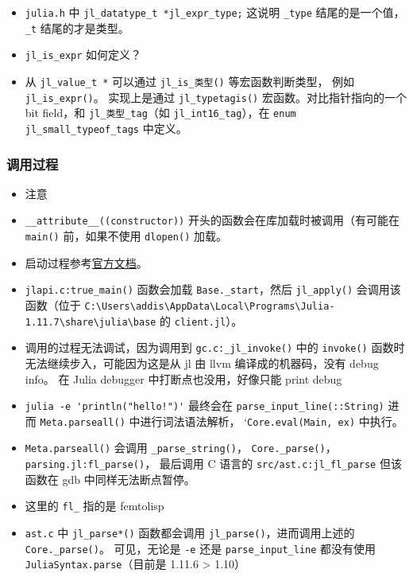 \begin{itemize}
\begin{lstlisting}[language=cpp]
    // followed by alignment padding and inline data, or owner pointer
} jl_array_t;
\end{lstlisting}
\verb`jl_array_len()` 可以获取长度， \verb`ajl_array_ptr_ref()` 可以获取矩阵元

\item \verb`julia.h` 中 \verb`jl_datatype_t *jl_expr_type;` 这说明 \verb`_type` 结尾的是一个值，\verb`_t` 结尾的才是类型。
\item \verb`jl_is_expr` 如何定义？
\item 从 \verb`jl_value_t *` 可以通过 \verb`jl_is_类型()` 等宏函数判断类型， 例如 \verb`jl_is_expr()`。 实现上是通过 \verb`jl_typetagis()` 宏函数。对比指针指向的一个 bit field，和 \verb`jl_类型_tag`（如 \verb`jl_int16_tag`），在 \verb`enum jl_small_typeof_tags` 中定义。
\end{itemize}


\subsubsection{调用过程}
\begin{itemize}
\item 注意 \item \verb`__attribute__((constructor))` 开头的函数会在库加载时被调用（有可能在 \verb`main()` 前，如果不使用 \verb`dlopen()` 加载。
\item 启动过程参考\href{https://docs.julialang.org/en/v1/devdocs/init/}{官方文档}。
\item \verb`jlapi.c:true_main()` 函数会加载 \verb`Base._start`，然后 \verb`jl_apply()` 会调用该函数（位于 \verb`C:\Users\addis\AppData\Local\Programs\Julia-1.11.7\share\julia\base` 的 \verb`client.jl`）。
\item 调用的过程无法调试，因为调用到 \verb`gc.c:_jl_invoke()` 中的 \verb`invoke()` 函数时无法继续步入，可能因为这是从 jl 由 llvm 编译成的机器码，没有 debug info。 在 Julia debugger 中打断点也没用，好像只能 print debug
\item \verb`julia -e 'println("hello!")'` 最终会在 \verb`parse_input_line(::String)` 进而 \verb`Meta.parseall()` 中进行词法语法解析， `\verb`Core.eval(Main, ex)` 中执行。
\item \verb`Meta.parseall()` 会调用 \verb`_parse_string()`， \verb`Core._parse()`， \verb`parsing.jl:fl_parse()`， 最后调用 C 语言的 \verb`src/ast.c:jl_fl_parse` 但该函数在 gdb 中同样无法断点暂停。
\item 这里的 \verb`fl_` 指的是 femtolisp
\item \verb`ast.c` 中 \verb`jl_parse*()` 函数都会调用 \verb`jl_parse()`，进而调用上述的 \verb`Core._parse()`。 可见，无论是 \verb`-e` 还是 \verb`parse_input_line` 都没有使用 \verb`JuliaSyntax.parse`（目前是 1.11.6 > 1.10）
\end{itemize}

